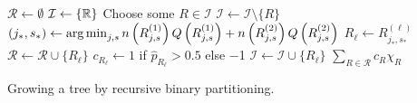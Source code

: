   \begin{algorithm}
    \begin{algorithmic}[1]
        \State $\mathcal{R} \gets \emptyset$ 
        \State $\mathcal{I} \gets \{ \mathbb{R} \}$ 
          \State Choose some $R \in \mathcal{I}$
          \State $\mathcal{I} \gets \mathcal{I} \setminus \{ R \}$
          \State $(j_*, s_*) \gets \operatorname*{arg\,min}_{j, s} n\left(R_{j,s}^{(1)}\right) Q\left(R_{j,s}^{(1)}\right) + 
            n\left(R_{j,s}^{(2)}\right) Q\left(R_{j,s}^{(2)}\right)$ \label{alg:tree:split}
            \State $R_\ell \gets R_{j_*, s_*}^{(\ell)}$
              \State $\mathcal{R} \gets \mathcal{R} \cup \{ R_\ell \}$
              \State $c_{R_\ell} \gets 1$ if $\hat{p}_{R_\ell} > \num{0.5}$ else \num{-1}
            \Else
              \State $\mathcal{I} \gets \mathcal{I} \cup \{ R_\ell \}$ 
            \EndIf
          \EndFor
        \EndWhile
        \State \Return $\sum_{R \in \mathcal{R}} c_R \chi_R$
      \EndFunction
    \end{algorithmic}
    \caption{Growing a tree by recursive binary partitioning.} \label{alg:tree}
  \end{algorithm}